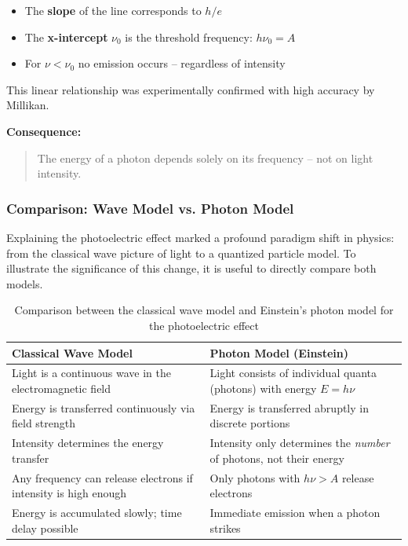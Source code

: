 \begin{itemize}
	\item The \textbf{slope} of the line corresponds to \( h/e \)
	\item The \textbf{x-intercept} \( \nu_0 \) is the threshold frequency: \( h \nu_0 = A \)
	\item For \( \nu < \nu_0 \) no emission occurs – regardless of intensity
\end{itemize}

This linear relationship was experimentally confirmed with high accuracy by Millikan.

\textbf{Consequence:}

\begin{quote}
	The energy of a photon depends solely on its frequency – not on light intensity.
\end{quote}

\subsubsection{Comparison: Wave Model vs. Photon Model}

Explaining the photoelectric effect marked a profound paradigm shift in physics: from the classical wave picture of light to a quantized particle model. To illustrate the significance of this change, it is useful to directly compare both models.

\vspace{1em}
\begin{table}[H]
	\centering
	\begin{tabular}{|p{4.75cm}|p{4.75cm}|}
		\hline
		\textbf{Classical Wave Model} & \textbf{Photon Model (Einstein)} \\
		\hline
		Light is a continuous wave in the electromagnetic field & Light consists of individual quanta (photons) with energy \( E = h\nu \) \\
		\hline
		Energy is transferred continuously via field strength & Energy is transferred abruptly in discrete portions \\
		\hline
		Intensity determines the energy transfer & Intensity only determines the \emph{number} of photons, not their energy \\
		\hline
		Any frequency can release electrons if intensity is high enough & Only photons with \( h\nu > A \) release electrons \\
		\hline
		Energy is accumulated slowly; time delay possible & Immediate emission when a photon strikes \\
		\hline
	\end{tabular}
	\caption{Comparison between the classical wave model and Einstein’s photon model for the photoelectric effect}
	\label{tab:vergleich_photoeffekt}
\end{table}

